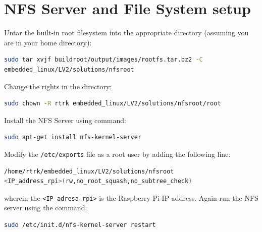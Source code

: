 \documentclass[11pt]{article}
\begin{document}
\section{NFS Server and File System setup}
Untar the built-in root filesystem into the appropriate directory (assuming you
 are in your home directory):
\begin{lstlisting}[language=bash]
sudo tar xvjf buildroot/output/images/rootfs.tar.bz2 -C
embedded_linux/LV2/solutions/nfsroot
\end{lstlisting}
Change the rights in the directory:
\begin{lstlisting}[language=bash]
sudo chown -R rtrk embedded_linux/LV2/solutions/nfsroot/root
\end{lstlisting}
Install the NFS Server using command:
\begin{lstlisting}[language=bash]
sudo apt-get install nfs-kernel-server
\end{lstlisting}
Modify the \texttt{/etc/exports} file as a root user by adding the following
 line:
\begin{lstlisting}[language=bash]
/home/rtrk/embedded_linux/LV2/solutions/nfsroot
<IP_address_rpi>(rw,no_root_squash,no_subtree_check)
\end{lstlisting}
wherein the \texttt{<IP\_adresa\_rpi>} is the Raspberry Pi IP address. Again
run the NFS server using the command:
\begin{lstlisting}[language=bash]
sudo /etc/init.d/nfs-kernel-server restart
\end{lstlisting}
\end{document}
